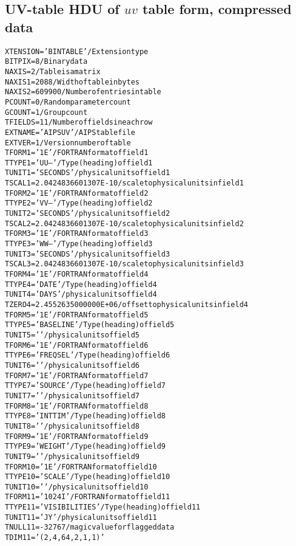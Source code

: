 \documentclass[twoside]{article}
\begin{document}
\subsection{UV-table HDU of $uv$ table form, compressed data}
\label{Appe:UVcomptable}
\small
\begin{alltt}
XTENSION= 'BINTABLE'           / Extension type
BITPIX  =                    8 / Binary data
NAXIS   =                    2 / Table is a matrix
NAXIS1  =                 2088 / Width of table in bytes
NAXIS2  =               609900 / Number of entries in table
PCOUNT  =                    0 / Random parameter count
GCOUNT  =                    1 / Group count
TFIELDS =                   11 / Number of fields in each row
EXTNAME = 'AIPS UV '           / AIPS table file
EXTVER  =                    1 / Version number of table
TFORM1  = '1E      '           / FORTRAN format of field  1
TTYPE1  = 'UU--            '   / Type (heading) of field  1
TUNIT1  = 'SECONDS '           / physical units of field  1
TSCAL1  =  2.0424836601307E-10 / scale to physical units in field  1
TFORM2  = '1E      '           / FORTRAN format of field  2
TTYPE2  = 'VV--            '   / Type (heading) of field  2
TUNIT2  = 'SECONDS '           / physical units of field  2
TSCAL2  =  2.0424836601307E-10 / scale to physical units in field  2
TFORM3  = '1E      '           / FORTRAN format of field  3
TTYPE3  = 'WW--            '   / Type (heading) of field  3
TUNIT3  = 'SECONDS '           / physical units of field  3
TSCAL3  =  2.0424836601307E-10 / scale to physical units in field  3
TFORM4  = '1E      '           / FORTRAN format of field  4
TTYPE4  = 'DATE            '   / Type (heading) of field  4
TUNIT4  = 'DAYS    '           / physical units of field  4
TZERO4  =  2.4552635000000E+06 / offset to physical units in field  4
TFORM5  = '1E      '           / FORTRAN format of field  5
TTYPE5  = 'BASELINE        '   / Type (heading) of field  5
TUNIT5  = '        '           / physical units of field  5
TFORM6  = '1E      '           / FORTRAN format of field  6
TTYPE6  = 'FREQSEL         '   / Type (heading) of field  6
TUNIT6  = '        '           / physical units of field  6
TFORM7  = '1E      '           / FORTRAN format of field  7
TTYPE7  = 'SOURCE          '   / Type (heading) of field  7
TUNIT7  = '        '           / physical units of field  7
TFORM8  = '1E      '           / FORTRAN format of field  8
TTYPE8  = 'INTTIM          '   / Type (heading) of field  8
TUNIT8  = '        '           / physical units of field  8
TFORM9  = '1E      '           / FORTRAN format of field  9
TTYPE9  = 'WEIGHT          '   / Type (heading) of field  9
TUNIT9  = '        '           / physical units of field  9
TFORM10 = '1E      '           / FORTRAN format of field 10
TTYPE10 = 'SCALE           '   / Type (heading) of field 10
TUNIT10 = '        '           / physical units of field 10
TFORM11 = '1024I   '           / FORTRAN format of field 11
TTYPE11 = 'VISIBILITIES    '   / Type (heading) of field 11
TUNIT11 = 'JY      '           / physical units of field 11
TNULL11 =               -32767 / magic value for flagged data
TDIM11  = '(2,4,64,2,1,1)'


\end{alltt}
\end{document}
